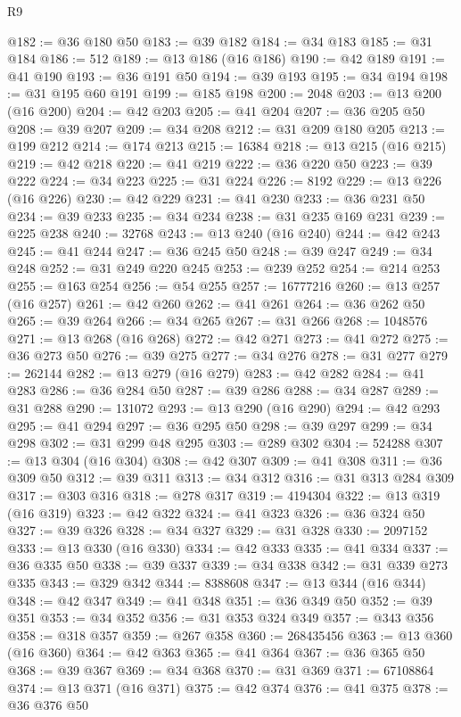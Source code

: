 \begin{lexlean}{R9}
\begin{coremodule}
@182 := @36 @180 @50
@183 := @39 @182
@184 := @34 @183
@185 := @31 @184
@186 := 512
@189 := @13 @186 (@16 @186)
@190 := @42 @189
@191 := @41 @190
@193 := @36 @191 @50
@194 := @39 @193
@195 := @34 @194
@198 := @31 @195 @60 @191
@199 := @185 @198
@200 := 2048
@203 := @13 @200 (@16 @200)
@204 := @42 @203
@205 := @41 @204
@207 := @36 @205 @50
@208 := @39 @207
@209 := @34 @208
@212 := @31 @209 @180 @205
@213 := @199 @212
@214 := @174 @213
@215 := 16384
@218 := @13 @215 (@16 @215)
@219 := @42 @218
@220 := @41 @219
@222 := @36 @220 @50
@223 := @39 @222
@224 := @34 @223
@225 := @31 @224
@226 := 8192
@229 := @13 @226 (@16 @226)
@230 := @42 @229
@231 := @41 @230
@233 := @36 @231 @50
@234 := @39 @233
@235 := @34 @234
@238 := @31 @235 @169 @231
@239 := @225 @238
@240 := 32768
@243 := @13 @240 (@16 @240)
@244 := @42 @243
@245 := @41 @244
@247 := @36 @245 @50
@248 := @39 @247
@249 := @34 @248
@252 := @31 @249 @220 @245
@253 := @239 @252
@254 := @214 @253
@255 := @163 @254
@256 := @54 @255
@257 := 16777216
@260 := @13 @257 (@16 @257)
@261 := @42 @260
@262 := @41 @261
@264 := @36 @262 @50
@265 := @39 @264
@266 := @34 @265
@267 := @31 @266
@268 := 1048576
@271 := @13 @268 (@16 @268)
@272 := @42 @271
@273 := @41 @272
@275 := @36 @273 @50
@276 := @39 @275
@277 := @34 @276
@278 := @31 @277
@279 := 262144
@282 := @13 @279 (@16 @279)
@283 := @42 @282
@284 := @41 @283
@286 := @36 @284 @50
@287 := @39 @286
@288 := @34 @287
@289 := @31 @288
@290 := 131072
@293 := @13 @290 (@16 @290)
@294 := @42 @293
@295 := @41 @294
@297 := @36 @295 @50
@298 := @39 @297
@299 := @34 @298
@302 := @31 @299 @48 @295
@303 := @289 @302
@304 := 524288
@307 := @13 @304 (@16 @304)
@308 := @42 @307
@309 := @41 @308
@311 := @36 @309 @50
@312 := @39 @311
@313 := @34 @312
@316 := @31 @313 @284 @309
@317 := @303 @316
@318 := @278 @317
@319 := 4194304
@322 := @13 @319 (@16 @319)
@323 := @42 @322
@324 := @41 @323
@326 := @36 @324 @50
@327 := @39 @326
@328 := @34 @327
@329 := @31 @328
@330 := 2097152
@333 := @13 @330 (@16 @330)
@334 := @42 @333
@335 := @41 @334
@337 := @36 @335 @50
@338 := @39 @337
@339 := @34 @338
@342 := @31 @339 @273 @335
@343 := @329 @342
@344 := 8388608
@347 := @13 @344 (@16 @344)
@348 := @42 @347
@349 := @41 @348
@351 := @36 @349 @50
@352 := @39 @351
@353 := @34 @352
@356 := @31 @353 @324 @349
@357 := @343 @356
@358 := @318 @357
@359 := @267 @358
@360 := 268435456
@363 := @13 @360 (@16 @360)
@364 := @42 @363
@365 := @41 @364
@367 := @36 @365 @50
@368 := @39 @367
@369 := @34 @368
@370 := @31 @369
@371 := 67108864
@374 := @13 @371 (@16 @371)
@375 := @42 @374
@376 := @41 @375
@378 := @36 @376 @50

\end{coremodule}
\end{lexlean}
